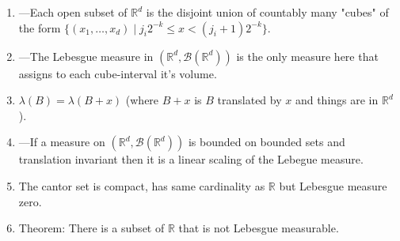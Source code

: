 \documentclass{article}
\begin{document}
\begin{enumerate}
\begin{align*}
    \end{align*}
    \item ---Each open subset of $\mathbb{R}^d$ is the disjoint union of countably many "cubes" of the form $\{(x_1,\ldots,x_d) \mid j_i2^{-k}\leq x < (j_i+1)2^{-k}\}$.
    \item ---The Lebesgue measure in $(\mathbb{R}^d,\mathscr{B}(\mathbb{R}^d))$ is the only measure here that assigns to each cube-interval it's volume.
    \item $\lambda(B) = \lambda(B+x)$ (where $B+x$ is $B$ translated by $x$ and things are in $\mathbb{R}^d$).
    \item ---If a measure on $(\mathbb{R}^d,\mathscr{B}(\mathbb{R}^d))$ is bounded on bounded sets and translation invariant then it is a linear scaling of the Lebegue measure.
    \item The cantor set is compact, has same cardinality as $\mathbb{R}$ but Lebesgue measure zero.
    \item Theorem: There is a subset of $\mathbb{R}$ that is not Lebesgue measurable.

\end{enumerate}
\end{document}

